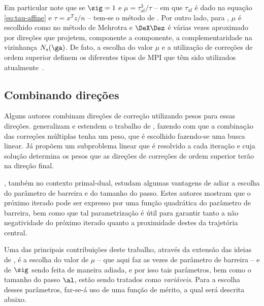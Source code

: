 Em particular note
que se  $\sig = 1$ e $\mu = \tau_{\text{af}}^3/\tau$ -- em que $\tau_{\text{af}}$ é dado
na equação \eqref{eq:tau-affine} e $\tau=x^Tz/n$ -- tem-se o método de
\citet{Mehrotra:1992wr}. Por outro lado, para \citet{Gondzio:1996uw}, $\mu$ é
escolhido como no método de Mehrotra e $\DeX\Dez$ é várias vezes aproximado por
direções que projetem, componente a componente, a complementaridade na
vizinhança $N_s(\ga)$. De fato, a escolha do valor $\mu$ e a utilização de
correções de ordem superior definem os diferentes tipos de \ac{MPI} que têm sido
utilizados atualmente~\cite{Wright:Primal-dual-interior-point:1997h}.




\subsection{Combinando direções}




Alguns autores 
combinam direções de correção utilizando pesos para essas direções.
 \citet{Colombo:2008ia} generalizam e estendem o trabalho de \citet{Gondzio:1996uw},
fazendo com que a combinação das correções múltiplas  tenha um peso, que é
escolhido fazendo-se uma busca linear. Já \citet{Jarre:1999tl}  propõem um subproblema
linear que é resolvido a cada iteração e cuja solução determina os pesos que as direções de 
correções de ordem superior terão na direção final. 

\citet{VillasBoas:2003tg}, também no contexto primal-dual, estudam algumas
vantagens de adiar a escolha do parâmetro de barreira e do tamanho do passo.
Estes autores mostram que o próximo iterado pode ser expresso por uma função
quadrática do parâmetro de barreira, bem como que tal parametrização é útil
para garantir tanto a não negatividade do próximo iterado quanto a proximidade destes da
trajetória central. 

Uma das principais contribuições deste trabalho, através da extensão das ideias
de \citet{VillasBoas:2003tg}, é a escolha do valor de $\mu$ -- que aqui faz as
vezes de parâmetro de barreira -- e de $\sig$  sendo feita de maneira adiada, e
por isso tais parâmetros, bem como o tamanho do passo $\al$, estão sendo
tratados como \emph{variáveis}. Para a escolha desses parâmetros, far-se-á uso de uma
função de mérito, a qual será descrita abaixo.
 
